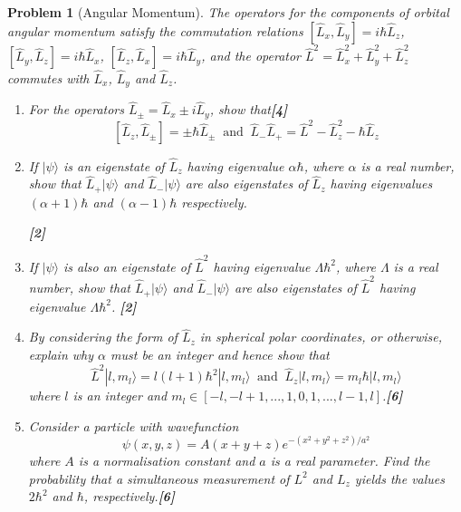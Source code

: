 \documentclass[a4paper]{article}
\theoremstyle{new}
\newtheorem{qns}{Problem}[subsection]
\begin{document}
\begin{qns}[Angular Momentum]
The operators for the components of orbital angular momentum satisfy the commutation relations $[\hat{L}_x,\hat{L}_y]=i\hbar\hat{L}_z$, $[\hat{L}_y,\hat{L}_z]=i\hbar\hat{L}_x$, $[\hat{L}_z,\hat{L}_x]=i\hbar\hat{L}_y$, and the operator $\hat{L}^2=\hat{L}_x^2+\hat{L}_y^2+\hat{L}_z^2$ commutes with $\hat{L}_x$, $\hat{L}_y$ and $\hat{L}_z$.
\begin{enumerate}[label=(\roman*)]
\item For the operators $\hat{L}_\pm=\hat{L}_x\pm i\hat{L}_y$, show that\hfill\textbf{[4]} 
$$[\hat{L}_z,\hat{L}_\pm]=\pm\hbar\hat{L}_\pm~\text{ and }~\hat{L}_-\hat{L}_+=\hat{L}^2-\hat{L}_z^2-\hbar\hat{L}_z$$
\item If $|\psi\rangle$ is an eigenstate of $\hat{L}_z$ having eigenvalue $\alpha\hbar$, where $\alpha$ is a real number, show that $\hat{L}_+|\psi\rangle$ and $\hat{L}_-|\psi\rangle$ are also eigenstates of $\hat{L}_z$ having eigenvalues $(\alpha + 1)\hbar$ and $(\alpha-1)\hbar$ respectively.

\hfill\textbf{[2]}
\item If $|\psi\rangle$ is also an eigenstate of $\hat{L}^2$ having eigenvalue $\Lambda\hbar^2$, where $\Lambda$ is a real number, show that $\hat{L}_+|\psi\rangle$ and $\hat{L}_-|\psi\rangle$ are also eigenstates of $\hat{L}^2$ having eigenvalue $\Lambda\hbar^2$. \hfill\textbf{[2]}
\item By considering the form of $\hat{L}_z$ in spherical polar coordinates, or otherwise, explain why $\alpha$ must be an integer and hence show that
$$\hat{L}^2|l,m_l\rangle=l(l+1)\hbar^2|l,m_l\rangle~\text{ and }~\hat{L}_z|l,m_l\rangle=m_l\hbar|l,m_l\rangle$$
where $l$ is an integer and $m_l\in[-l,-l+1,...,1,0,1,...,l-1,l]$.\hfill\textbf{[6]}
\item Consider a particle with wavefunction
$$\psi(x,y,z)=A(x+y+z)e^{-(x^2+y^2+z^2)/a^2}$$
where $A$ is a normalisation constant and $a$ is a real parameter. Find the probability that a simultaneous measurement of $L^2$ and $L_z$ yields the values $2\hbar^2$ and $\hbar$, respectively.\hfill\textbf{[6]}
\end{enumerate}
\begin{mdframed}
\end{mdframed}
\end{qns}
\end{document}
